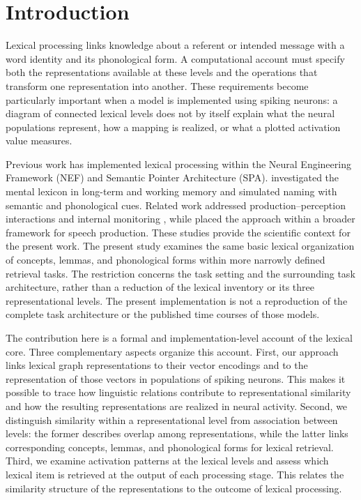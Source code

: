\section{Introduction}
Lexical processing links knowledge about a referent or intended message with a word identity and its phonological form. A computational account must specify both the representations available at these levels and the operations that transform one representation into another. These requirements become particularly important when a model is implemented using spiking neurons: a diagram of connected lexical levels does not by itself explain what the neural populations represent, how a mapping is realized, or what a plotted activation value measures.

Previous work has implemented lexical processing within the Neural Engineering Framework (NEF) and Semantic Pointer Architecture (SPA). \citet{stille2020} investigated the mental lexicon in long-term and working memory and simulated naming with semantic and phonological cues. Related work addressed production--perception interactions and internal monitoring \citep{kroeger2016}, while \citet{kroeger2023} placed the approach within a broader framework for speech production. These studies provide the scientific context for the present work. The present study examines the same basic lexical organization of concepts, lemmas, and phonological forms within more narrowly defined retrieval tasks. The restriction concerns the task setting and the surrounding task architecture, rather than a reduction of the lexical inventory or its three representational levels. The present implementation is not a reproduction of the complete task architecture or the published time courses of those models.

The contribution here is a formal and implementation-level account of the lexical core. Three complementary aspects organize this account. First, our approach links lexical graph representations to their vector encodings and to the representation of those vectors in populations of spiking neurons. This makes it possible to trace how linguistic relations contribute to representational similarity and how the resulting representations are realized in neural activity. Second, we distinguish similarity within a representational level from association between levels: the former describes overlap among representations, while the latter links corresponding concepts, lemmas, and phonological forms for lexical retrieval. Third, we examine activation patterns at the lexical levels and assess which lexical item is retrieved at the output of each processing stage. This relates the similarity structure of the representations to the outcome of lexical processing.

